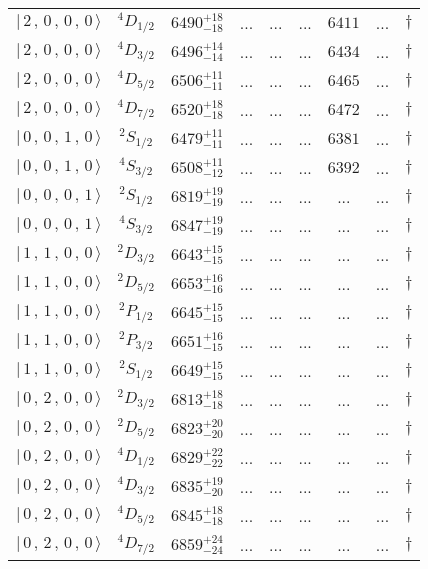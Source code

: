 \begin{tabular}{c c| c c c c c c c}
$\vert \,2\,,\,0\,,\,0\,,\,0 \,\rangle $ & $^{4}D_{1/2}$ & $6490^{+18}_{-18}$ & ... & ... & ... & $6411$ & ... & $\dagger$ \\ 
$\vert \,2\,,\,0\,,\,0\,,\,0 \,\rangle $ & $^{4}D_{3/2}$ & $6496^{+14}_{-14}$ & ... & ... & ... & $6434$ & ... & $\dagger$ \\ 
$\vert \,2\,,\,0\,,\,0\,,\,0 \,\rangle $ & $^{4}D_{5/2}$ & $6506^{+11}_{-11}$ & ... & ... & ... & $6465$ & ... & $\dagger$ \\ 
$\vert \,2\,,\,0\,,\,0\,,\,0 \,\rangle $ & $^{4}D_{7/2}$ & $6520^{+18}_{-18}$ & ... & ... & ... & $6472$ & ... & $\dagger$ \\ 
$\vert \,0\,,\,0\,,\,1\,,\,0 \,\rangle $ & $^{2}S_{1/2}$ & $6479^{+11}_{-11}$ & ... & ... & ... & $6381$ & ... & $\dagger$ \\ 
$\vert \,0\,,\,0\,,\,1\,,\,0 \,\rangle $ & $^{4}S_{3/2}$ & $6508^{+11}_{-12}$ & ... & ... & ... & $6392$ & ... & $\dagger$ \\ 
$\vert \,0\,,\,0\,,\,0\,,\,1 \,\rangle $ & $^{2}S_{1/2}$ & $6819^{+19}_{-19}$ & ... & ... & ... & ... & ... & $\dagger$ \\ 
$\vert \,0\,,\,0\,,\,0\,,\,1 \,\rangle $ & $^{4}S_{3/2}$ & $6847^{+19}_{-19}$ & ... & ... & ... & ... & ... & $\dagger$ \\ 
$\vert \,1\,,\,1\,,\,0\,,\,0 \,\rangle $ & $^{2}D_{3/2}$ & $6643^{+15}_{-15}$ & ... & ... & ... & ... & ... & $\dagger$ \\ 
$\vert \,1\,,\,1\,,\,0\,,\,0 \,\rangle $ & $^{2}D_{5/2}$ & $6653^{+16}_{-16}$ & ... & ... & ... & ... & ... & $\dagger$ \\ 
$\vert \,1\,,\,1\,,\,0\,,\,0 \,\rangle $ & $^{2}P_{1/2}$ & $6645^{+15}_{-15}$ & ... & ... & ... & ... & ... & $\dagger$ \\ 
$\vert \,1\,,\,1\,,\,0\,,\,0 \,\rangle $ & $^{2}P_{3/2}$ & $6651^{+16}_{-15}$ & ... & ... & ... & ... & ... & $\dagger$ \\ 
$\vert \,1\,,\,1\,,\,0\,,\,0 \,\rangle $ & $^{2}S_{1/2}$ & $6649^{+15}_{-15}$ & ... & ... & ... & ... & ... & $\dagger$ \\ 
$\vert \,0\,,\,2\,,\,0\,,\,0 \,\rangle $ & $^{2}D_{3/2}$ & $6813^{+18}_{-18}$ & ... & ... & ... & ... & ... & $\dagger$ \\ 
$\vert \,0\,,\,2\,,\,0\,,\,0 \,\rangle $ & $^{2}D_{5/2}$ & $6823^{+20}_{-20}$ & ... & ... & ... & ... & ... & $\dagger$ \\ 
$\vert \,0\,,\,2\,,\,0\,,\,0 \,\rangle $ & $^{4}D_{1/2}$ & $6829^{+22}_{-22}$ & ... & ... & ... & ... & ... & $\dagger$ \\ 
$\vert \,0\,,\,2\,,\,0\,,\,0 \,\rangle $ & $^{4}D_{3/2}$ & $6835^{+19}_{-20}$ & ... & ... & ... & ... & ... & $\dagger$ \\ 
$\vert \,0\,,\,2\,,\,0\,,\,0 \,\rangle $ & $^{4}D_{5/2}$ & $6845^{+18}_{-18}$ & ... & ... & ... & ... & ... & $\dagger$ \\ 
$\vert \,0\,,\,2\,,\,0\,,\,0 \,\rangle $ & $^{4}D_{7/2}$ & $6859^{+24}_{-24}$ & ... & ... & ... & ... & ... & $\dagger$ \\ 
\hline \hline
\end{tabular}

